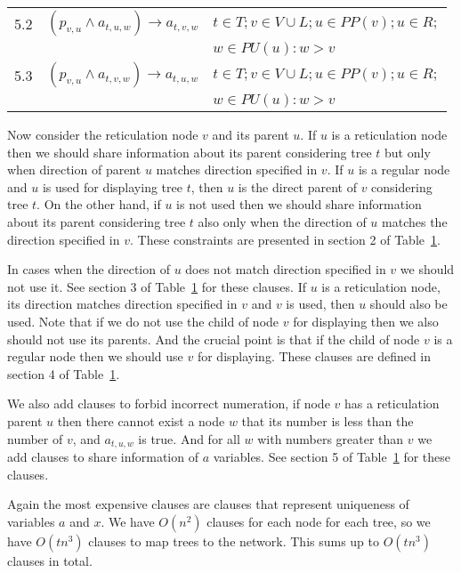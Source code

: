 \documentclass[runningheads, envcountsame, a4paper]{llncs}
\begin{document}
\begin{table}[t]
\begin{tabular}{l | l | l}
  5.2 &
  $(p_{v,u} \wedge a_{t,u,w}) \rightarrow a_{t,v,w}$ &
  $t \in T; v \in V \cup L; u \in PP(v); u \in R;$
  \\ & & $w \in PU(u): w > v$
  \\
  
  5.3 &
  $(p_{v,u} \wedge a_{t,v,w}) \rightarrow a_{t,u,w}$ &
  $t \in T; v \in V \cup L; u \in PP(v); u \in R;$
  \\ & & $w \in PU(u): w > v$
  \\

\end{tabular}
\label{child-parent-table}
\end{table}

Now consider the reticulation node $v$ and its parent $u$. If $u$ is a reticulation node then we should share information 
about its parent considering tree $t$ but only when direction of parent $u$ matches direction specified in $v$. 
If $u$ is a regular node and $u$ is used for displaying tree $t$, then $u$ is the direct parent of $v$ considering tree $t$.
On the other hand, if $u$ is not used then we should share information about its parent considering tree $t$ also 
only when the direction of $u$ matches the direction specified in $v$. These constraints are presented in section 2 of Table~\ref{child-parent-table}.

In cases when the direction of $u$ does not match direction specified in $v$ we should not use it. See section 3 of Table~\ref{child-parent-table} 
for these clauses. If $u$ is a reticulation node, its direction matches direction specified in $v$ and $v$ is used, then $u$ should also be used.
Note that if we do not use the child of node $v$ for displaying then we also should not use its parents. And the crucial point is that
if the child of node $v$ is a regular node then we should use $v$ for displaying. 
These clauses are defined in section 4 of Table~\ref{child-parent-table}.

We also add clauses to forbid incorrect numeration, if node $v$ has a reticulation parent $u$ then there cannot 
exist a node $w$ that its number is less than the number of $v$, and $a_{t,u,w}$ is true. And for all $w$ with numbers 
greater than $v$ we add clauses to share information of $a$ variables. See section 5 of Table~\ref{child-parent-table} for these clauses.

Again the most expensive clauses are clauses that represent uniqueness of variables $a$ and $x$. We have $O(n^2)$ clauses for
each node for each tree, so we have $O(tn^3)$ clauses to map trees to the network. This sums up to $O(tn^3)$ clauses in total.
\end{document}
